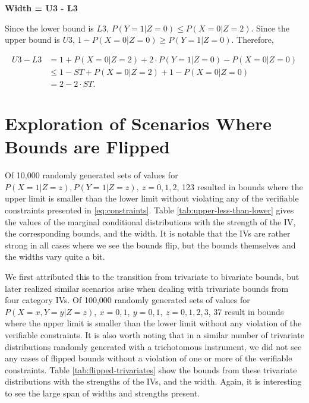 \documentclass[
]{article}
\theoremstyle{plain}
\begin{document}
\textbf{Width = U3 - L3}

Since the lower bound is \(L3\), \(P(Y = 1 | Z = 0) \le P(X = 0 | Z = 2)\). Since the upper bound is \(U3\), \(1 - P(X = 0 | Z = 0) \ge P(Y = 1 | Z = 0)\). Therefore,

\[\begin{aligned}
U3 - L3 &= 1 + P(X = 0 | Z = 2) + 2\cdot P(Y = 1 | Z = 0) - P(X = 0 | Z = 0) \\
        &\le 1 - ST + P(X = 0 | Z = 2) + 1 - P(X = 0 | Z = 0) \\
        &= 2 - 2\cdot ST.
\end{aligned}\]

\newpage

\hypertarget{exploration-of-scenarios-where-bounds-are-flipped}{%
\section{Exploration of Scenarios Where Bounds are Flipped}\label{exploration-of-scenarios-where-bounds-are-flipped}}

Of 10,000 randomly generated sets of values for \(P(X = 1 | Z = z), P(Y = 1 | Z = z),\ z = 0,1,2\), 123 resulted in bounds where the upper limit is smaller than the lower limit without violating any of the verifiable constraints presented in \eqref{eq:constraints}. Table \ref{tab:upper-less-than-lower} gives the values of the marginal conditional distributions with the strength of the IV, the corresponding bounds, and the width. It is notable that the IVs are rather strong in all cases where we see the bounds flip, but the bounds themselves and the widths vary quite a bit.

We first attributed this to the transition from trivariate to bivariate bounds, but later realized similar scenarios arise when dealing with trivariate bounds from four category IVs. Of 100,000 randomly generated sets of values for \(P(X = x, Y = y | Z = z),\ x=0,1,\ y=0,1,\ z=0,1,2,3\), 37 result in bounds where the upper limit is smaller than the lower limit without any violation of the verifiable constraints. It is also worth noting that in a similar number of trivariate distributions randomly generated with a trichotomous instrument, we did not see any cases of flipped bounds without a violation of one or more of the verifiable constraints. Table \ref{tab:flipped-trivariates} show the bounds from these trivariate distributions with the strengths of the IVs, and the width. Again, it is interesting to see the large span of widths and strengths present.
\end{document}
